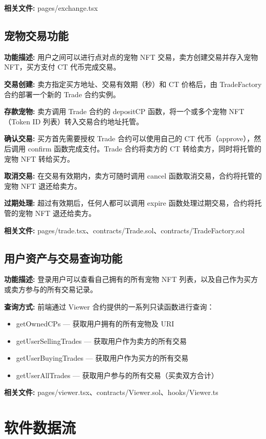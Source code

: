 \documentclass{mancls}
\begin{document}
\textbf{相关文件:} pages/exchange.tsx

\subsection{宠物交易功能}

\textbf{功能描述:} 用户之间可以进行点对点的宠物 NFT 交易，卖方创建交易并存入宠物 NFT，买方支付 CT 代币完成交易。

\textbf{交易创建:} 卖方指定买方地址、交易有效期（秒）和 CT 价格后，由 TradeFactory 合约部署一个新的 Trade 合约实例。

\textbf{存款宠物:} 卖方调用 Trade 合约的 depositCP 函数，将一个或多个宠物 NFT（Token ID 列表）转入交易合约地址托管。

\textbf{确认交易:} 买方首先需要授权 Trade 合约可以使用自己的 CT 代币（approve），然后调用 confirm 函数完成支付。Trade 合约将卖方的 CT 转给卖方，同时将托管的宠物 NFT 转给买方。

\textbf{取消交易:} 在交易有效期内，卖方可随时调用 cancel 函数取消交易，合约将托管的宠物 NFT 退还给卖方。

\textbf{过期处理:} 超过有效期后，任何人都可以调用 expire 函数处理过期交易，合约将托管的宠物 NFT 退还给卖方。

\textbf{相关文件:} pages/trade.tsx、contracts/Trade.sol、contracts/TradeFactory.sol

\subsection{用户资产与交易查询功能}

\textbf{功能描述:} 登录用户可以查看自己拥有的所有宠物 NFT 列表，以及自己作为买方或卖方参与的所有交易记录。

\textbf{查询方式:} 前端通过 Viewer 合约提供的一系列只读函数进行查询：
\begin{itemize}
	\item getOwnedCPs — 获取用户拥有的所有宠物及 URI
	\item getUserSellingTrades — 获取用户作为卖方的所有交易
	\item getUserBuyingTrades — 获取用户作为买方的所有交易
	\item getUserAllTrades — 获取用户参与的所有交易（买卖双方合计）
\end{itemize}

\textbf{相关文件:} pages/viewer.tsx、contracts/Viewer.sol、hooks/Viewer.ts

\section{软件数据流}
\end{document}
